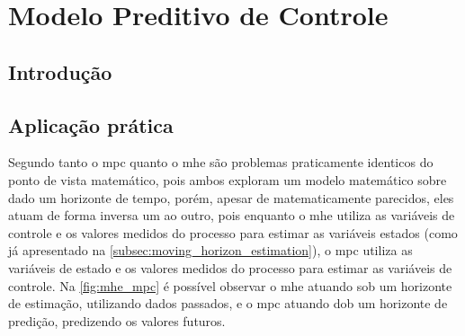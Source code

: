 \chapter{Modelo Preditivo de Controle}
\label{ch:mpc}

\section{Introdução}




\section{Aplicação prática}
\label{sec:aplicacao_pratica}

Segundo  tanto o \acrshort{mpc} quanto o \acrshort{mhe} são problemas praticamente
identicos do ponto de vista matemático, pois ambos exploram um modelo matemático sobre dado um horizonte de
tempo, porém, apesar de matematicamente parecidos, eles atuam de forma inversa um ao outro, pois
enquanto o \acrshort{mhe} utiliza as variáveis de controle e os valores medidos do processo para estimar
as variáveis estados (como já apresentado na \cref{subsec:moving_horizon_estimation}), o \acrshort{mpc}
utiliza as variáveis de estado e os valores medidos do processo para estimar as variáveis de controle.
Na \cref{fig:mhe_mpc} é possível observar o \acrshort{mhe} atuando sob um horizonte de estimação, utilizando
dados passados, e o \acrshort{mpc} atuando dob um horizonte de predição, predizendo os valores futuros.

